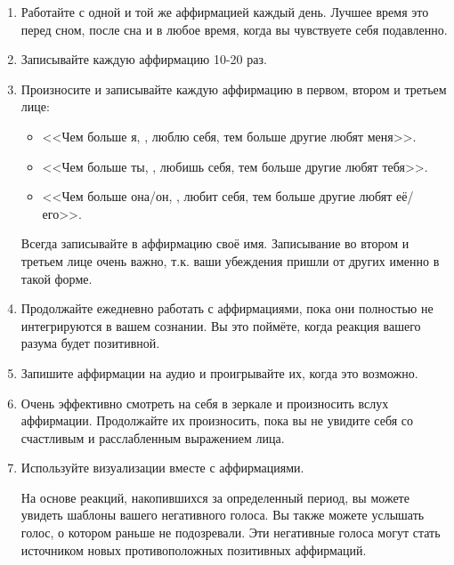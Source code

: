 \documentclass[10pt, fleqn]{article}
\begin{document}
\begin{enumerate}
\item Работайте с одной и той же аффирмацией каждый день. Лучшее время это перед сном, после сна и в любое время, когда вы чувствуете себя подавленно.
\item Записывайте каждую аффирмацию 10-20 раз.
\item Произносите и записывайте каждую аффирмацию в первом, втором и третьем лице:
\begin{itemize}
\item <<Чем больше я, \underline{\hspace*{2cm}}, люблю себя, тем больше другие любят меня>>.
\item <<Чем больше ты, \underline{\hspace*{2cm}}, любишь себя, тем больше другие любят тебя>>.
\item <<Чем больше она/он, \underline{\hspace*{2cm}}	, любит себя, тем больше другие любят её/его>>.
\end{itemize}
Всегда записывайте в аффирмацию своё имя. Записывание во втором и третьем лице очень важно, т.к. ваши убеждения пришли от других именно в такой форме.

\item Продолжайте ежедневно работать с аффирмациями, пока они полностью не интегрируются в вашем сознании. Вы это поймёте, когда реакция вашего разума будет позитивной.
\item Запишите аффирмации на аудио и проигрывайте их, когда это возможно. 
\item Очень эффективно смотреть на себя в зеркале и произносить вслух аффирмации. Продолжайте их произносить, пока вы не увидите себя со счастливым и расслабленным выражением лица.
\item Используйте визуализации вместе с аффирмациями.

На основе реакций, накопившихся за определенный период, вы можете увидеть шаблоны вашего негативного голоса. Вы также можете услышать голос, о котором раньше не подозревали. Эти негативные голоса могут стать источником новых противоположных позитивных аффирмаций.

\end{enumerate}


\end{document}
